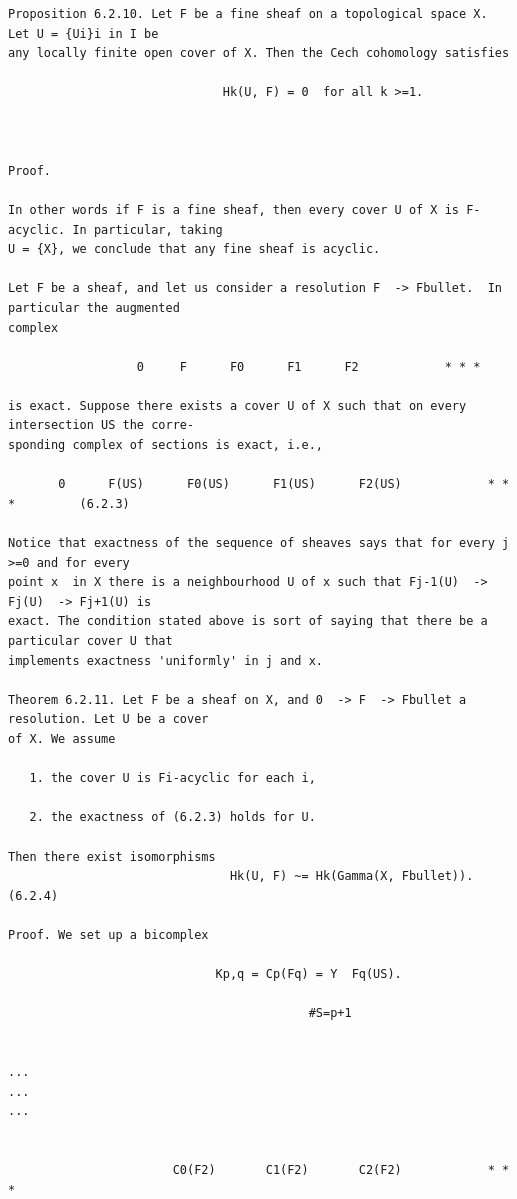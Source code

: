 \begin{Verbatim}[fontsize=\footnotesize]
Proposition 6.2.10. Let F be a fine sheaf on a topological space X. Let U = {Ui}i in I be
any locally finite open cover of X. Then the Cech cohomology satisfies

                              Hk(U, F) = 0  for all k >=1.



Proof.

In other words if F is a fine sheaf, then every cover U of X is F-acyclic. In particular, taking
U = {X}, we conclude that any fine sheaf is acyclic.

Let F be a sheaf, and let us consider a resolution F  -> Fbullet.  In particular the augmented
complex

                  0     F      F0      F1      F2            * * *

is exact. Suppose there exists a cover U of X such that on every intersection US the corre-
sponding complex of sections is exact, i.e.,

       0      F(US)      F0(US)      F1(US)      F2(US)            * * *         (6.2.3)

Notice that exactness of the sequence of sheaves says that for every j >=0 and for every
point x  in X there is a neighbourhood U of x such that Fj-1(U)  -> Fj(U)  -> Fj+1(U) is
exact. The condition stated above is sort of saying that there be a particular cover U that
implements exactness 'uniformly' in j and x.

Theorem 6.2.11. Let F be a sheaf on X, and 0  -> F  -> Fbullet a resolution. Let U be a cover
of X. We assume

   1. the cover U is Fi-acyclic for each i,

   2. the exactness of (6.2.3) holds for U.

Then there exist isomorphisms
                               Hk(U, F) ~= Hk(Gamma(X, Fbullet)).                            (6.2.4)

Proof. We set up a bicomplex

                             Kp,q = Cp(Fq) = Y  Fq(US).

                                          #S=p+1

                                                                                                                          ...                                                                  ...                                                                  ...


                       C0(F2)       C1(F2)       C2(F2)            * * *



\end{Verbatim}
